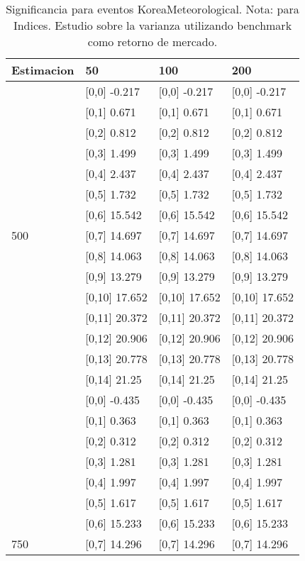 \begin{table}

\caption{Significancia para eventos KoreaMeteorological. Nota: para Indices. Estudio sobre la varianza utilizando benchmark como retorno de mercado.}
\centering
\begin{tabular}[t]{llll}
\toprule
Estimacion & 50 & 100 & 200\\
\midrule
 & {}[0,0] -0.217 & {}[0,0] -0.217 & {}[0,0] -0.217\\
 & {}[0,1] 0.671 & {}[0,1] 0.671 & {}[0,1] 0.671\\
 & {}[0,2] 0.812 & {}[0,2] 0.812 & {}[0,2] 0.812\\
 & {}[0,3] 1.499 & {}[0,3] 1.499 & {}[0,3] 1.499\\
 & {}[0,4] 2.437 & {}[0,4] 2.437 & {}[0,4] 2.437\\
\addlinespace
 & {}[0,5] 1.732 & {}[0,5] 1.732 & {}[0,5] 1.732\\
 & {}[0,6] 15.542 & {}[0,6] 15.542 & {}[0,6] 15.542\\
500 & {}[0,7] 14.697 & {}[0,7] 14.697 & {}[0,7] 14.697\\
 & {}[0,8] 14.063 & {}[0,8] 14.063 & {}[0,8] 14.063\\
 & {}[0,9] 13.279 & {}[0,9] 13.279 & {}[0,9] 13.279\\
\addlinespace
 & {}[0,10] 17.652 & {}[0,10] 17.652 & {}[0,10] 17.652\\
 & {}[0,11] 20.372 & {}[0,11] 20.372 & {}[0,11] 20.372\\
 & {}[0,12] 20.906 & {}[0,12] 20.906 & {}[0,12] 20.906\\
 & {}[0,13] 20.778 & {}[0,13] 20.778 & {}[0,13] 20.778\\
 & {}[0,14] 21.25 & {}[0,14] 21.25 & {}[0,14] 21.25\\
\addlinespace
 & {}[0,0] -0.435 & {}[0,0] -0.435 & {}[0,0] -0.435\\
 & {}[0,1] 0.363 & {}[0,1] 0.363 & {}[0,1] 0.363\\
 & {}[0,2] 0.312 & {}[0,2] 0.312 & {}[0,2] 0.312\\
 & {}[0,3] 1.281 & {}[0,3] 1.281 & {}[0,3] 1.281\\
 & {}[0,4] 1.997 & {}[0,4] 1.997 & {}[0,4] 1.997\\
\addlinespace
 & {}[0,5] 1.617 & {}[0,5] 1.617 & {}[0,5] 1.617\\
 & {}[0,6] 15.233 & {}[0,6] 15.233 & {}[0,6] 15.233\\
750 & {}[0,7] 14.296 & {}[0,7] 14.296 & {}[0,7] 14.296\\

\end{tabular}
\end{table}
